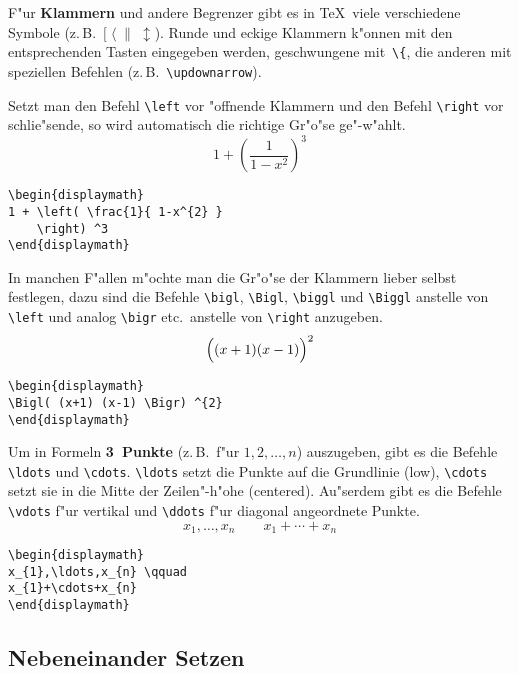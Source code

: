 F"ur \textbf{Klammern} und andere Begrenzer gibt es in \TeX\ 
viele verschiedene Symbole
(z.\,B.~\([\;\langle\;\|\;\updownarrow\)).
Runde und eckige Klammern k"onnen mit den entsprechenden Tasten
eingegeben werden, geschwungene mit~\verb|\{|, die anderen mit
speziellen Befehlen (z.\,B.~\verb|\updownarrow|).
 
Setzt man den Befehl \verb|\left| vor "offnende Klammern und den
Befehl \verb|\right| vor schlie"sende, so wird automatisch die
richtige Gr"o"se ge"-w"ahlt.
\exa
\begin{displaymath}
1 + \left( \frac{1}{ 1-x^{2} }
    \right) ^3
\end{displaymath}
\exb
\begin{verbatim}
\begin{displaymath}
1 + \left( \frac{1}{ 1-x^{2} }
    \right) ^3
\end{displaymath}
\end{verbatim}
\exc
 
In manchen F"allen m"ochte man die Gr"o"se der Klammern lieber
selbst festlegen, dazu sind die Befehle
\verb|\bigl|,
\verb|\Bigl|,
\verb|\biggl| und
\verb|\Biggl| anstelle von \verb|\left|
und analog \verb|\bigr| etc.\ anstelle von \verb|\right|
anzugeben.
\exa
\begin{displaymath}
\Bigl( (x+1) (x-1) \Bigr) ^{2}
\end{displaymath}
\exb
\begin{verbatim}
\begin{displaymath}
\Bigl( (x+1) (x-1) \Bigr) ^{2}
\end{displaymath}
\end{verbatim}
\exc
 
Um in Formeln \textbf{3~Punkte} (z.\,B.\ f"ur \(1,2,\ldots,n\))
auszugeben, gibt es die Befehle
\verb|\ldots| und \verb|\cdots|.
\verb|\ldots| setzt die Punkte auf die Grundlinie (low),
\verb|\cdots| setzt sie in die Mitte der Zeilen"-h"ohe
(centered).
Au"serdem gibt es die Befehle
\verb|\vdots| f"ur vertikal und
\verb|\ddots| f"ur diagonal angeordnete Punkte.
\exa
\begin{displaymath}
x_{1},\ldots,x_{n} \qquad
x_{1}+\cdots+x_{n}
\end{displaymath}
\exb
\begin{verbatim}
\begin{displaymath}
x_{1},\ldots,x_{n} \qquad
x_{1}+\cdots+x_{n}
\end{displaymath}
\end{verbatim}
\exc


\subsection{Nebeneinander Setzen}
 
